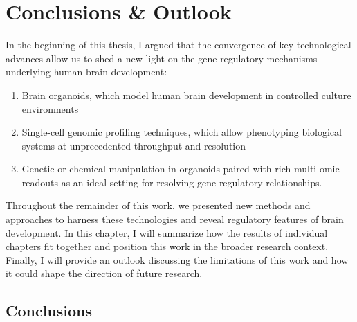 \thispagestyle{plain}
\section{Conclusions \& Outlook}

In the beginning of this thesis, I argued that the convergence of key technological advances allow us to shed a new light on the gene regulatory mechanisms underlying human brain development:

\begin{enumerate}
    \item Brain organoids, which model human brain development in controlled culture environments 
    \item Single-cell genomic profiling techniques, which allow phenotyping biological systems at unprecedented throughput and resolution
    \item Genetic or chemical manipulation in organoids paired with rich multi-omic readouts as an ideal setting for resolving gene regulatory relationships.
\end{enumerate}

Throughout the remainder of this work, we presented new methods and approaches to harness these technologies and reveal regulatory features of brain development. In this chapter, I will summarize how the results of individual chapters fit together and position this work in the broader research context. Finally, I will provide an outlook discussing the limitations of this work and how it could shape the direction of future research.

\subsection{Conclusions}

